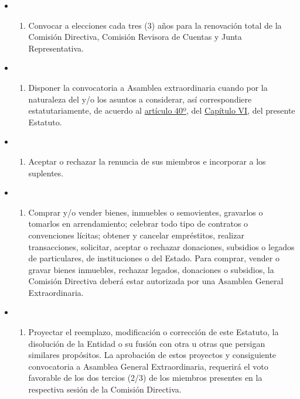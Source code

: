 \documentclass[]{book}
\providecommand{\tightlist}{%
  \setlength{\itemsep}{0pt}\setlength{\parskip}{0pt}}
\begin{document}
\begin{itemize}
\begin{itemize}
\begin{enumerate}
    \end{enumerate}
  \item
    \begin{enumerate}
    \def\labelenumi{\alph{enumi})}
    \setcounter{enumi}{4}
    \tightlist
    \item
      Convocar a elecciones cada tres (3) años para la renovación total de la Comisión Directiva, Comisión Revisora de Cuentas y Junta Representativa.
    \end{enumerate}
  \item
    \begin{enumerate}
    \def\labelenumi{\alph{enumi})}
    \setcounter{enumi}{5}
    \tightlist
    \item
      Disponer la convocatoria a Asamblea extraordinaria cuando por la naturaleza del y/o los asuntos a considerar, así correspondiere estatutariamente, de acuerdo al \protect\hyperlink{art40}{artículo 40º}, del \protect\hyperlink{cap6}{Capítulo VI}, del presente Estatuto.
    \end{enumerate}
  \item
    \begin{enumerate}
    \def\labelenumi{\alph{enumi})}
    \setcounter{enumi}{6}
    \tightlist
    \item
      Aceptar o rechazar la renuncia de sus miembros e incorporar a los suplentes.
    \end{enumerate}
  \item
    \begin{enumerate}
    \def\labelenumi{\alph{enumi})}
    \setcounter{enumi}{7}
    \tightlist
    \item
      Comprar y/o vender bienes, inmuebles o semovientes, gravarlos o tomarlos en arrendamiento; celebrar todo tipo de contratos o convenciones lícitas; obtener y cancelar empréstitos, realizar transacciones, solicitar, aceptar o rechazar donaciones, subsidios o legados de particulares, de instituciones o del Estado. Para comprar, vender o gravar bienes inmuebles, rechazar legados, donaciones o subsidios, la Comisión Directiva deberá estar autorizada por una Asamblea General Extraordinaria.
    \end{enumerate}
  \item
    \begin{enumerate}
    \def\labelenumi{\roman{enumi})}
    \tightlist
    \item
      Proyectar el reemplazo, modificación o corrección de este Estatuto, la disolución de la Entidad o su fusión con otra u otras que persigan similares propósitos. La aprobación de estos proyectos y consiguiente convocatoria a Asamblea General Extraordinaria, requerirá el voto favorable de los dos tercios (2/3) de los miembros presentes en la respectiva sesión de la Comisión Directiva.

\end{enumerate}
\end{itemize}
\end{itemize}
\end{document}
